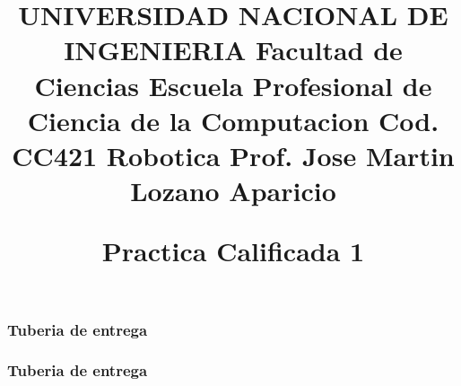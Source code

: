\documentclass{beamer}
\title{ 
  \fontsize{90}{90} UNIVERSIDAD NACIONAL DE INGENIERIA \linebreak    
    Facultad de Ciencias\linebreak    
    Escuela Profesional de Ciencia de la Computacion\linebreak    
    \small  Cod. CC421 Robotica \linebreak
    \small Prof. Jose Martin Lozano Aparicio\linebreak

{\textbf{\small Practica Calificada 1}} \vspace{-3em}


}
\date{} %
\begin{document}
\begin{frame}
	\frametitle{Tuberia de entrega }
	
\end{frame}
\begin{frame}
	\frametitle{Tuberia de entrega }
	
\end{frame}
\end{document}

